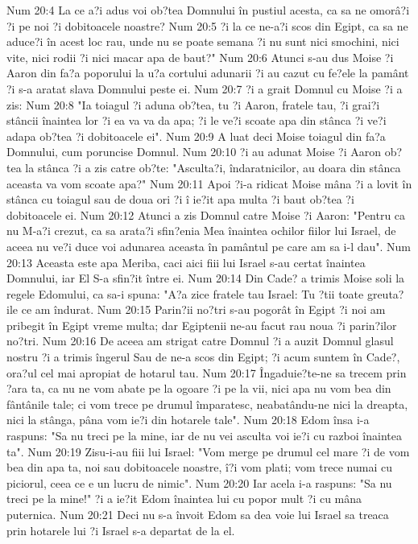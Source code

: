 Num 20:4  La ce a?i adus voi ob?tea Domnului în pustiul acesta, ca sa ne omorâ?i ?i pe noi ?i dobitoacele noastre?
Num 20:5  ?i la ce ne-a?i scos din Egipt, ca sa ne aduce?i în acest loc rau, unde nu se poate semana ?i nu sunt nici smochini, nici vite, nici rodii ?i nici macar apa de baut?"
Num 20:6  Atunci s-au dus Moise ?i Aaron din fa?a poporului la u?a cortului adunarii ?i au cazut cu fe?ele la pamânt ?i s-a aratat slava Domnului peste ei.
Num 20:7  ?i a grait Domnul cu Moise ?i a zis:
Num 20:8  "Ia toiagul ?i aduna ob?tea, tu ?i Aaron, fratele tau, ?i grai?i stâncii înaintea lor ?i ea va va da apa; ?i le ve?i scoate apa din stânca ?i ve?i adapa ob?tea ?i dobitoacele ei".
Num 20:9  A luat deci Moise toiagul din fa?a Domnului, cum poruncise Domnul.
Num 20:10  ?i au adunat Moise ?i Aaron ob?tea la stânca ?i a zis catre ob?te: "Asculta?i, îndaratnicilor, au doara din stânca aceasta va vom scoate apa?"
Num 20:11  Apoi ?i-a ridicat Moise mâna ?i a lovit în stânca cu toiagul sau de doua ori ?i î ie?it apa multa ?i baut ob?tea ?i dobitoacele ei.
Num 20:12  Atunci a zis Domnul catre Moise ?i Aaron: "Pentru ca nu M-a?i crezut, ca sa arata?i sfin?enia Mea înaintea ochilor fiilor lui Israel, de aceea nu ve?i duce voi adunarea aceasta în pamântul pe care am sa i-l dau".
Num 20:13  Aceasta este apa Meriba, caci aici fiii lui Israel s-au certat înaintea Domnului, iar El S-a sfin?it între ei.
Num 20:14  Din Cade? a trimis Moise soli la regele Edomului, ca sa-i spuna: "A?a zice fratele tau Israel: Tu ?tii toate greuta?ile ce am îndurat.
Num 20:15  Parin?ii no?tri s-au pogorât în Egipt ?i noi am pribegit în Egipt vreme multa; dar Egiptenii ne-au facut rau noua ?i parin?ilor no?tri.
Num 20:16  De aceea am strigat catre Domnul ?i a auzit Domnul glasul nostru ?i a trimis îngerul Sau de ne-a scos din Egipt; ?i acum suntem în Cade?, ora?ul cel mai apropiat de hotarul tau.
Num 20:17  Îngaduie?te-ne sa trecem prin ?ara ta, ca nu ne vom abate pe la ogoare ?i pe la vii, nici apa nu vom bea din fântânile tale; ci vom trece pe drumul împaratesc, neabatându-ne nici la dreapta, nici la stânga, pâna vom ie?i din hotarele tale".
Num 20:18  Edom însa i-a raspuns: "Sa nu treci pe la mine, iar de nu vei asculta voi ie?i cu razboi înaintea ta".
Num 20:19  Zisu-i-au fiii lui Israel: "Vom merge pe drumul cel mare ?i de vom bea din apa ta, noi sau dobitoacele noastre, î?i vom plati; vom trece numai cu piciorul, ceea ce e un lucru de nimic".
Num 20:20  Iar acela i-a raspuns: "Sa nu treci pe la mine!" ?i a ie?it Edom înaintea lui cu popor mult ?i cu mâna puternica.
Num 20:21  Deci nu s-a învoit Edom sa dea voie lui Israel sa treaca prin hotarele lui ?i Israel s-a departat de la el.
